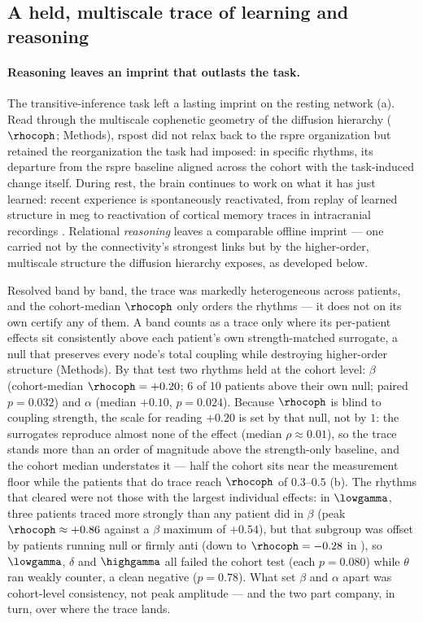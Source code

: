 \subsection{A held, multiscale trace of learning and reasoning}

\paragraph{Reasoning leaves an imprint that outlasts the task.}
The transitive-inference task left a lasting imprint on the resting network (a). Read through the multiscale cophenetic geometry of the diffusion hierarchy (\(\rhocoph\); Methods), \acrshort{rspost} did not relax back to the \acrshort{rspre} organization but retained the reorganization the task had imposed: in specific rhythms, its departure from the \acrshort{rspre} baseline aligned across the cohort with the task-induced change itself. During rest, the brain continues to work on what it has just learned: recent experience is spontaneously reactivated, from replay of learned structure in \gls{meg} \cite{liu2019human} to reactivation of cortical memory traces in intracranial recordings \cite{duan2025awake}. Relational \emph{reasoning} leaves a comparable offline imprint --- one carried not by the connectivity's strongest links but by the higher-order, multiscale structure the diffusion hierarchy exposes, as developed below.

Resolved band by band, the trace was markedly heterogeneous across patients, and the cohort-median \(\rhocoph\) only orders the rhythms --- it does not on its own certify any of them. A band counts as a trace only where its per-patient effects sit consistently above each patient's own strength-matched surrogate, a null that preserves every node's total coupling while destroying higher-order structure (Methods). By that test two rhythms held at the cohort level: \(\beta\) (cohort-median \(\rhocoph = +0.20\); 6 of 10 patients above their own null; paired \(p = 0.032\)) and \(\alpha\) (median \(+0.10\), \(p = 0.024\)). Because \(\rhocoph\) is blind to coupling strength, the scale for reading \(+0.20\) is set by that null, not by \(1\): the surrogates reproduce almost none of the effect (median \(\rho \approx 0.01\)), so the trace stands more than an order of magnitude above the strength-only baseline, and the cohort median understates it --- half the cohort sits near the measurement floor while the patients that do trace reach \(\rhocoph\) of \(0.3\)--\(0.5\) (b). The rhythms that cleared were not those with the largest individual effects: in \(\lowgamma\), three patients traced more strongly than any patient did in \(\beta\) (peak \(\rhocoph \approx +0.86\) against a \(\beta\) maximum of \(+0.54\)), but that subgroup was offset by patients running null or firmly anti (down to \(\rhocoph = -0.28\) in ), so \(\lowgamma\), \(\delta\) and \(\highgamma\) all failed the cohort test (each \(p = 0.080\)) while \(\theta\) ran weakly counter, a clean negative (\(p = 0.78\)). What set \(\beta\) and \(\alpha\) apart was cohort-level consistency, not peak amplitude --- and the two part company, in turn, over where the trace lands.

